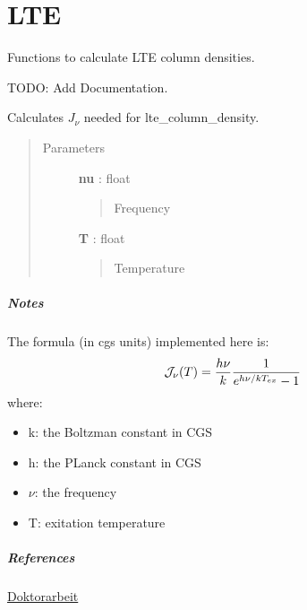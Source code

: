 \documentclass[a4paper,10pt,english]{sphinxmanual}
\begin{document}
\chapter{LTE}
\label{lte:module-astrolyze.lte.lte}\label{lte::doc}\label{lte:lte}
Functions to calculate LTE column densities.

TODO: Add Documentation.

\begin{fulllineitems}
\label{lte:astrolyze.lte.lte.calc_jnu}
Calculates $J_{\nu}$ needed for lte\_column\_density.
\begin{quote}\begin{description}
\item[{Parameters }] \leavevmode
\textbf{nu} : float
\begin{quote}

Frequency
\end{quote}

\textbf{T} : float
\begin{quote}

Temperature
\end{quote}

\end{description}\end{quote}
\paragraph{Notes}

The formula (in cgs units) implemented here is:
\begin{gather}
\begin{split}\mathcal{J}_{\nu}(T) = \frac{h\nu}{k} \frac{1}{e^{h\nu/kT_{ex}}-1}\end{split}\notag
\end{gather}
where:
\begin{itemize}
\item {} 
k: the Boltzman constant in CGS

\item {} 
h: the PLanck constant in CGS

\item {} 
$\nu$: the frequency

\item {} 
T: exitation temperature

\end{itemize}
\paragraph{References}

{\hyperref[lte:doktorarbeit]{Doktorarbeit}}

\end{fulllineitems}
\end{document}
